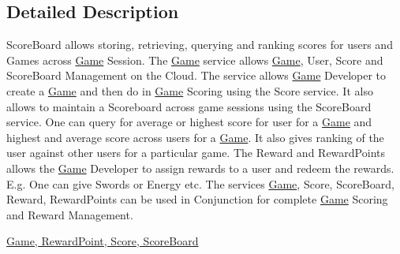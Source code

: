 \subsection{Detailed Description}
Score\+Board allows storing, retrieving, querying and ranking scores for users and Games across \hyperlink{classcom_1_1shephertz_1_1app42_1_1paas_1_1sdk_1_1windows_1_1game_1_1_game}{Game} Session. The \hyperlink{classcom_1_1shephertz_1_1app42_1_1paas_1_1sdk_1_1windows_1_1game_1_1_game}{Game} service allows \hyperlink{classcom_1_1shephertz_1_1app42_1_1paas_1_1sdk_1_1windows_1_1game_1_1_game}{Game}, User, Score and Score\+Board Management on the Cloud. The service allows \hyperlink{classcom_1_1shephertz_1_1app42_1_1paas_1_1sdk_1_1windows_1_1game_1_1_game}{Game} Developer to create a \hyperlink{classcom_1_1shephertz_1_1app42_1_1paas_1_1sdk_1_1windows_1_1game_1_1_game}{Game} and then do in \hyperlink{classcom_1_1shephertz_1_1app42_1_1paas_1_1sdk_1_1windows_1_1game_1_1_game}{Game} Scoring using the Score service. It also allows to maintain a Scoreboard across game sessions using the Score\+Board service. One can query for average or highest score for user for a \hyperlink{classcom_1_1shephertz_1_1app42_1_1paas_1_1sdk_1_1windows_1_1game_1_1_game}{Game} and highest and average score across users for a \hyperlink{classcom_1_1shephertz_1_1app42_1_1paas_1_1sdk_1_1windows_1_1game_1_1_game}{Game}. It also gives ranking of the user against other users for a particular game. The Reward and Reward\+Points allows the \hyperlink{classcom_1_1shephertz_1_1app42_1_1paas_1_1sdk_1_1windows_1_1game_1_1_game}{Game} Developer to assign rewards to a user and redeem the rewards. E.\+g. One can give Swords or Energy etc. The services \hyperlink{classcom_1_1shephertz_1_1app42_1_1paas_1_1sdk_1_1windows_1_1game_1_1_game}{Game}, Score, Score\+Board, Reward, Reward\+Points can be used in Conjunction for complete \hyperlink{classcom_1_1shephertz_1_1app42_1_1paas_1_1sdk_1_1windows_1_1game_1_1_game}{Game} Scoring and Reward Management. 

\hyperlink{classcom_1_1shephertz_1_1app42_1_1paas_1_1sdk_1_1windows_1_1game_1_1_score_board_service}{Game, Reward\+Point, Score, Score\+Board} 

